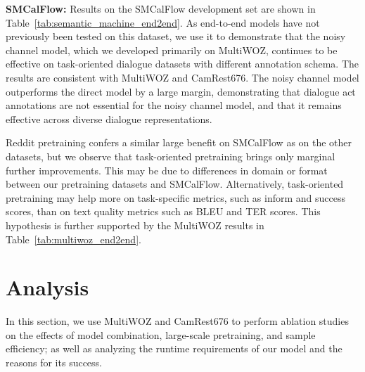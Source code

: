 \documentclass[11pt,a4paper]{article}
\begin{document}
{\bf SMCalFlow:}
Results on the SMCalFlow development set are shown in Table~\ref{tab:semantic_machine_end2end}. As end-to-end models have not previously been tested on this dataset, we use it to demonstrate that the noisy channel model, which we developed primarily on MultiWOZ, continues to be effective on task-oriented dialogue datasets with different annotation schema. The results are consistent with MultiWOZ and CamRest676. The noisy channel model outperforms the direct model by a large margin, demonstrating that dialogue act annotations are not essential for the noisy channel model, and that it remains effective across diverse dialogue representations.

Reddit pretraining confers a similar large benefit on SMCalFlow as on the other datasets, but we observe that task-oriented pretraining brings only marginal further improvements. This may be due to differences in domain or format between our pretraining datasets and SMCalFlow. Alternatively, task-oriented pretraining may help more on task-specific metrics, such as inform and success scores, than on text quality metrics such as BLEU and TER scores. This hypothesis is further supported by the MultiWOZ results in Table~\ref{tab:multiwoz_end2end}.





\section{Analysis}
\label{sec:analysis}

In this section, we use MultiWOZ and CamRest676 to perform ablation studies on the effects of model combination, large-scale pretraining, and sample efficiency; as well as analyzing the runtime requirements of our model and the reasons for its success.
\end{document}
